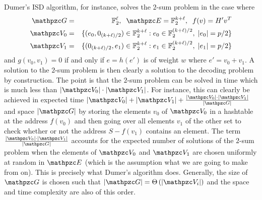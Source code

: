 Dumer's ISD algorithm, for instance, solves the $2$-sum problem in the case where
\begin{eqnarray*}
\zG & = &\Ft^\ell, \;\;\zE = \Ft^{k+\ell},\;\;f(v)  =  H'{v}^T\\
\zV_0 &= &\{(e_0,0_{(k+\ell)/2})\in \Ft^{k+\ell} : e_0 \in \Ft^{(k+\ell)/2},\; |e_0|=p/2\}  \\
\zV_1 &= &\{(0_{(k+\ell)/2},e_1)\in \Ft^{k+\ell} : e_1 \in \Ft^{(k+\ell)/2},\; |e_1|=p/2\} 
\end{eqnarray*}
and $g(v_0,v_1)=0$ if and only if $e=h(e')$ is of weight $w$ where $e'=v_0 + v_1$.
 A solution to the $2$-sum problem is then clearly a solution to the decoding problem by construction.
The point is that the $2$-sum problem can be solved in time which is much less than $|\zV_0|\cdot|\zV_1|$. For instance,
this can clearly be achieved in expected time $|\zV_0|+|\zV_1|+\frac{|\zV_0|\cdot|\zV_1|}{|\zG|}$
and space $|\zG|$ by storing the elements $v_0$ of $\zV_0$ in a hashtable at the address $f(v_0)$ and then going over all elements $v_1$ of the other set 
to check whether or not the address $S-f(v_1)$ contains an element. The term $\frac{|\zV_0|\cdot|\zV_1|}{|\zG|}$ accounts for the expected number of solutions 
of the $2$-sum problem when the elements of $\zV_0$ and $\zV_1$ are chosen uniformly at random in $\zE$ (which is the assumption what we are going to make from on).
This is precisely what Dumer's algorithm does. Generally, the size of $\zG$ is chosen such that $|\zG|=\Th{|\zV_i|}$ and the space and time complexity are
also of this order.


